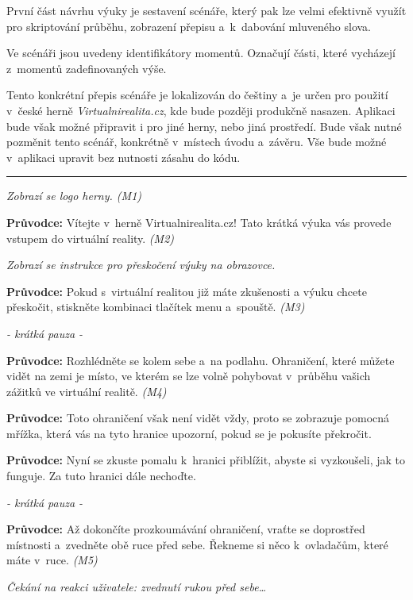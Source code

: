 První část návrhu výuky je sestavení scénáře, který pak lze velmi
efektivně využít pro skriptování průběhu, zobrazení přepisu a~k~dabování
mluveného slova.

Ve scénáři jsou uvedeny identifikátory momentů. Označují části, které
vycházejí z~momentů zadefinovaných výše.

\newpage

Tento konkrétní přepis scénáře je lokalizován do češtiny a~je určen pro
použití v~české herně \emph{Virtualnirealita.cz}, kde bude později
produkčně nasazen. Aplikaci bude však možné připravit i pro jiné herny,
nebo jiná prostředí. Bude však nutné pozměnit tento scénář, konkrétně
v~místech úvodu a~závěru. Vše bude možné v~aplikaci upravit bez nutnosti
zásahu do kódu.

\begin{center}\rule{0.5\linewidth}{\linethickness}\end{center}

\emph{Zobrazí se logo herny. (M1)}

\textbf{Průvodce:} Vítejte v~herně Virtualnirealita.cz! Tato krátká
výuka vás provede vstupem do virtuální reality. \emph{(M2)}

\emph{Zobrazí se instrukce pro přeskočení výuky na obrazovce.}

\textbf{Průvodce:} Pokud s~virtuální realitou již máte zkušenosti a
výuku chcete přeskočit, stiskněte kombinaci tlačítek menu a~spouště.
\emph{(M3)}

\emph{- krátká pauza -}

\textbf{Průvodce:} Rozhlédněte se kolem sebe a~na podlahu. Ohraničení,
které můžete vidět na zemi je místo, ve kterém se lze volně pohybovat
v~průběhu vašich zážitků ve virtuální realitě. \emph{(M4)}

\textbf{Průvodce:} Toto ohraničení však není vidět vždy, proto se
zobrazuje pomocná mřížka, která vás na tyto hranice upozorní, pokud se
je pokusíte překročit.

\textbf{Průvodce:} Nyní se zkuste pomalu k~hranici přiblížit, abyste si
vyzkoušeli, jak to funguje. Za tuto hranici dále nechoďte.

\emph{- krátká pauza -}

\textbf{Průvodce:} Až dokončíte prozkoumávání ohraničení, vraťte se
doprostřed místnosti a~zvedněte obě ruce před sebe. Řekneme si něco
k~ovladačům, které máte v~ruce. \emph{(M5)}

\emph{Čekání na reakci uživatele: zvednutí rukou před sebe\ldots{}}

